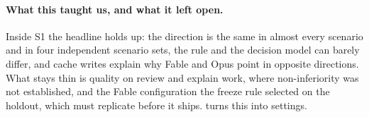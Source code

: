 \paragraph{What this taught us, and what it left open.} Inside S1 the headline holds up: the direction is the same in
almost every scenario and in four independent scenario sets, the rule and the decision model can barely differ, and
cache writes explain why Fable and Opus point in opposite directions. What stays thin is quality on review and explain
work, where non-inferiority was not established, and the Fable configuration the freeze rule selected on the holdout,
which must replicate before it ships.  turns this into settings.
